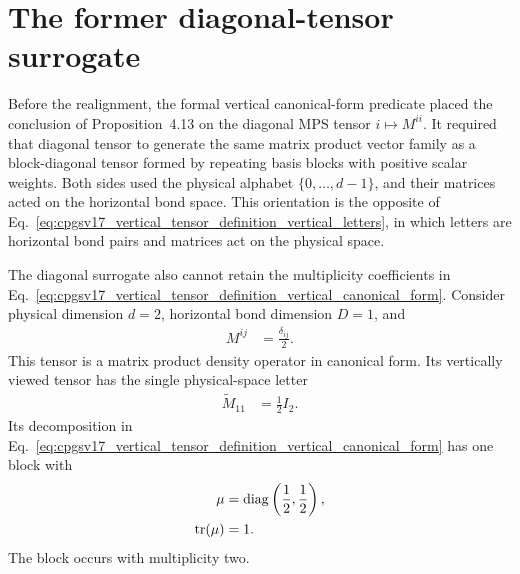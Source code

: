 \documentclass{article}
\begin{document}
\section{The former diagonal-tensor surrogate}

Before the realignment, the formal vertical canonical-form predicate placed
the conclusion of Proposition~4.13 on the diagonal MPS tensor
$i\mapsto M^{ii}$. It required that diagonal tensor to generate the same
matrix product vector family as a block-diagonal tensor formed by repeating
basis blocks with positive scalar weights. Both sides used the physical
alphabet $\{0,\ldots,d-1\}$, and their matrices acted on the horizontal bond
space. This orientation is the opposite of
Eq.~\ref{eq:cpgsv17_vertical_tensor_definition_vertical_letters}, in which
letters are horizontal bond pairs and matrices act on the physical space.

The diagonal surrogate also cannot retain the multiplicity coefficients in
Eq.~\ref{eq:cpgsv17_vertical_tensor_definition_vertical_canonical_form}.
Consider physical dimension $d=2$, horizontal bond dimension $D=1$, and
\begin{align}
    M^{ij}
        &=\frac{\delta_{ij}}{2}.
    \label{eq:cpgsv17_vertical_tensor_definition_scalar_mpdo}
\end{align}
This tensor is a matrix product density operator in canonical form. Its
vertically viewed tensor has the single physical-space letter
\begin{align}
    \widetilde M_{11}
        &=\frac{1}{2}I_2.
    \label{eq:cpgsv17_vertical_tensor_definition_scalar_vertical_letter}
\end{align}
Its decomposition in
Eq.~\ref{eq:cpgsv17_vertical_tensor_definition_vertical_canonical_form} has
one block with
\begin{align}
    \mu
        &=
        \operatorname{diag}\left(\frac{1}{2},\frac{1}{2}\right),
    \label{eq:cpgsv17_vertical_tensor_definition_twofold_weight}\\
    \operatorname{tr}(\mu)
        &=1.
    \label{eq:cpgsv17_vertical_tensor_definition_twofold_multiplicity_sum}
\end{align}
The block occurs with multiplicity two.
\end{document}
